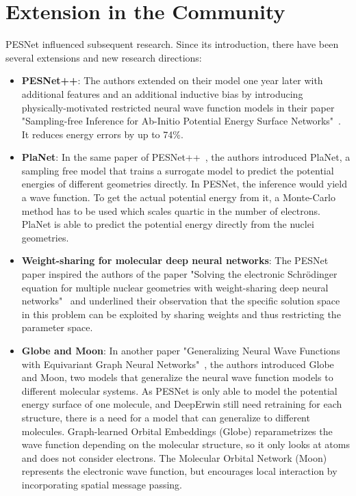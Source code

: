 \documentclass{article}
\begin{document}
\section{Extension in the Community}
PESNet influenced subsequent research. Since its introduction, there have been several extensions and new research directions:
\begin{itemize}
    \item \textbf{PESNet++}: The authors extended on their model one year later with additional features and an additional inductive bias by introducing physically-motivated restricted neural wave function models in their paper "Sampling-free Inference for Ab-Initio Potential Energy Surface Networks"~\cite{gao2023samplingfree}. It reduces energy errors by up to 74\%.
    \item \textbf{PlaNet}: In the same paper of PESNet++~\cite{gao2023samplingfree}, the authors introduced PlaNet, a sampling free model that trains a surrogate model to predict the potential energies of different geometries directly. In PESNet, the inference would yield a wave function. To get the actual potential energy from it, a Monte-Carlo method has to be used which scales quartic in the number of electrons. PlaNet is able to predict the potential energy directly from the nuclei geometries.
    \item \textbf{Weight-sharing for molecular deep neural networks}: The PESNet paper inspired the authors of the paper "Solving the electronic Schrödinger equation for multiple nuclear geometries with weight-sharing deep neural networks"~\cite{scherbela2022solving} and underlined their observation that the specific solution space in this problem can be exploited by sharing weights and thus restricting the parameter space.
    \item \textbf{Globe and Moon}: In another paper "Generalizing Neural Wave Functions with Equivariant Graph Neural Networks"~\cite{gao2023generalizing}, the authors introduced Globe and Moon, two models that generalize the neural wave function models to different molecular systems. As PESNet is only able to model the potential energy surface of one molecule, and DeepErwin still need retraining for each structure, there is a need for a model that can generalize to different molecules. Graph-learned Orbital Embeddings (Globe) reparametrizes the wave function depending on the molecular structure, so it only looks at atoms and does not consider electrons. The Molecular Orbital Network (Moon) represents the electronic wave function, but encourages local interaction by incorporating spatial message passing.
\end{itemize}
\end{document}
